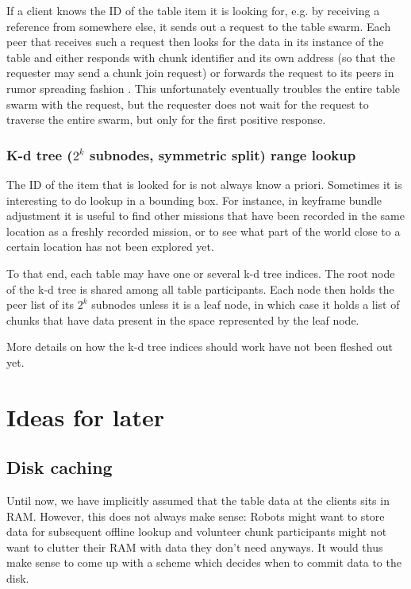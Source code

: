 \documentclass{article}
\begin{document}
If a client knows the ID of the table item it is looking for, e.g. by receiving
a reference from somewhere else, it sends out a request to the table swarm. Each
peer that receives such a request then looks for the data in its instance of the
table and either responds with chunk identifier and its own address (so that the
requester may send a chunk join request) or forwards the request to its peers in
rumor spreading fashion \cite{bitcoin}. This unfortunately eventually troubles
the entire table swarm with the request, but the requester does not wait for the
request to traverse the entire swarm, but only for the first positive response. 

\subsubsection{K-d tree ($2^k$ subnodes, symmetric split) range lookup}

The ID of the item that is looked for is not always know a priori. Sometimes
it is interesting to do lookup in a bounding box. For instance, in keyframe
bundle adjustment it is useful to find other missions that have been recorded
in the same location as a freshly recorded mission, or to see what part of the
world close to a certain location has not been explored yet.

To that end, each table may have one or several k-d tree indices.
The root node of the k-d tree is shared among all table participants. Each
node then holds the peer list of its $2^k$ subnodes unless it is a leaf node,
in which case it holds a list of chunks that have data present in the space
represented by the leaf node.

More details on how the k-d tree indices should work have not been fleshed out
yet.

\section{Ideas for later}

\subsection{Disk caching}

Until now, we have implicitly assumed that the table data at the clients sits
in RAM. However, this does not always make sense: Robots might want to store 
data for subsequent offline lookup and volunteer chunk participants might not
want to clutter their RAM with data they don't need anyways. It would thus make
sense to come up with a scheme which decides when to commit data to the disk.
\end{document}
